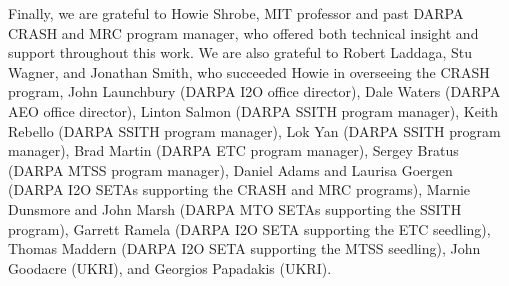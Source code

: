 \noindent
Finally, we are grateful to Howie Shrobe, MIT professor and past DARPA CRASH
and MRC program manager, who offered both technical insight and support
throughout this work.
We are also grateful to Robert Laddaga, Stu Wagner, and Jonathan Smith,
who succeeded Howie in overseeing the CRASH program,
John Launchbury (DARPA I2O office director),
Dale Waters (DARPA AEO office director),
Linton Salmon (DARPA SSITH program manager),
Keith Rebello (DARPA SSITH program manager),
Lok Yan (DARPA SSITH program manager),
Brad Martin (DARPA ETC program manager),
Sergey Bratus (DARPA MTSS program manager),
Daniel Adams and Laurisa Goergen (DARPA I2O SETAs supporting the CRASH and MRC programs),
Marnie Dunsmore and John Marsh (DARPA MTO SETAs supporting the SSITH program),
Garrett Ramela (DARPA I2O SETA supporting the ETC seedling),
Thomas Maddern (DARPA I2O SETA supporting the MTSS seedling),
John Goodacre (UKRI), and Georgios Papadakis (UKRI).
